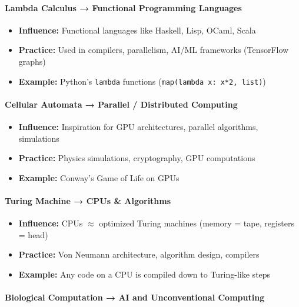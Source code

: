 \paragraph{Lambda Calculus → Functional Programming Languages}

\begin{itemize}
\item \textbf{Influence:} Functional languages like Haskell, Lisp, OCaml, Scala
\item \textbf{Practice:} Used in compilers, parallelism, AI/ML frameworks (TensorFlow graphs)
\item \textbf{Example:} Python's \texttt{lambda} functions (\texttt{map(lambda x: x*2, list)})
\end{itemize}

\paragraph{Cellular Automata → Parallel / Distributed Computing}

\begin{itemize}
\item \textbf{Influence:} Inspiration for GPU architectures, parallel algorithms, simulations
\item \textbf{Practice:} Physics simulations, cryptography, GPU computations
\item \textbf{Example:} Conway's Game of Life on GPUs
\end{itemize}

\paragraph{Turing Machine → CPUs \& Algorithms}

\begin{itemize}
\item \textbf{Influence:} CPUs $\approx$ optimized Turing machines (memory = tape, registers = head)
\item \textbf{Practice:} Von Neumann architecture, algorithm design, compilers
\item \textbf{Example:} Any code on a CPU is compiled down to Turing-like steps
\end{itemize}

\paragraph{Biological Computation → AI and Unconventional Computing}

